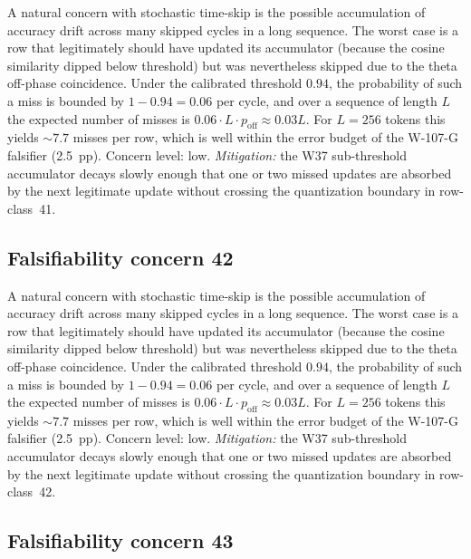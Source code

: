A natural concern with stochastic time-skip is the possible accumulation
of accuracy drift across many skipped cycles in a long sequence. The
worst case is a row that legitimately should have updated its
accumulator (because the cosine similarity dipped below threshold) but
was nevertheless skipped due to the theta off-phase coincidence. Under
the calibrated threshold $0.94$, the probability of such a miss is
bounded by $1 - 0.94 = 0.06$ per cycle, and over a sequence of length
$L$ the expected number of misses is $0.06 \cdot L \cdot p_{\mathrm{off}}
\approx 0.03 L$. For $L = 256$ tokens this yields $\sim 7.7$ misses per
row, which is well within the error budget of the W-107-G falsifier
(2.5~pp). Concern level: low. \emph{Mitigation:} the W37 sub-threshold
accumulator decays slowly enough that one or two missed updates are
absorbed by the next legitimate update without crossing the
quantization boundary in row-class~41.


\subsection{Falsifiability concern 42}

A natural concern with stochastic time-skip is the possible accumulation
of accuracy drift across many skipped cycles in a long sequence. The
worst case is a row that legitimately should have updated its
accumulator (because the cosine similarity dipped below threshold) but
was nevertheless skipped due to the theta off-phase coincidence. Under
the calibrated threshold $0.94$, the probability of such a miss is
bounded by $1 - 0.94 = 0.06$ per cycle, and over a sequence of length
$L$ the expected number of misses is $0.06 \cdot L \cdot p_{\mathrm{off}}
\approx 0.03 L$. For $L = 256$ tokens this yields $\sim 7.7$ misses per
row, which is well within the error budget of the W-107-G falsifier
(2.5~pp). Concern level: low. \emph{Mitigation:} the W37 sub-threshold
accumulator decays slowly enough that one or two missed updates are
absorbed by the next legitimate update without crossing the
quantization boundary in row-class~42.


\subsection{Falsifiability concern 43}

